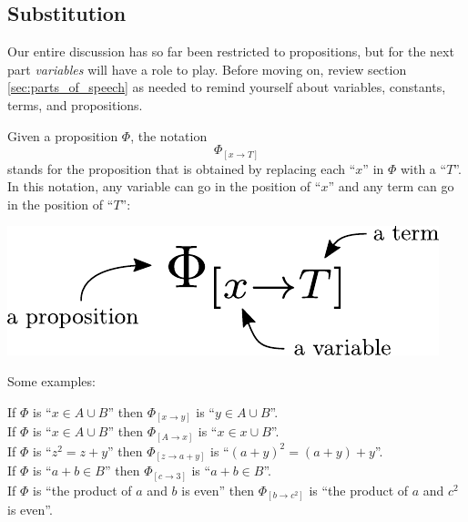 \documentclass[12pt]{article}
\newcommand{\SUBST}[3]{{#1}_{[{#2}\rightarrow{#3}]}}
\newcounter{exercise}
\newcounter{rule}
\newcommand{\indented}[1]{\begin{adjustwidth}{1em}{}#1\end{adjustwidth}}
\def\pA{\Phi}
\begin{document}








\subsection{Substitution}
\label{sec:subst}

Our entire discussion has so far been restricted to propositions, but for the next part \emph{variables} will have a role to play.
Before moving on, review section
\ref{sec:parts_of_speech} as needed to remind yourself about variables, constants, terms, and propositions.

\newcommand{\eg}[4]{If $\pA$ is ``#1'' then $\SUBST{\pA}{#2}{#3}$ is ``#4''.}
\def\lsp{\\[0.4em]}

Given a proposition $\pA$, the notation
$$
\SUBST{\pA}{x}{T}
$$
stands for the proposition that is obtained by replacing each ``$x$'' in $\pA$ with a ``$T$''.
In this notation, any variable can go in the position of ``$x$'' and any term can go in the position of ``$T$'':
\begin{center}\includegraphics[scale=0.8]{subst.pdf}\end{center}
Some examples:
\indented{
\eg{$x\in A\cup B$}{x}{y}{$y\in A\cup B$}\lsp
\eg{$x\in A\cup B$}{A}{x}{$x\in x\cup B$}\lsp
\eg{$z^2=z+y$}{z}{a+y}{$(a+y)^2=(a+y)+y$}\lsp
\eg{$a+b\in B$}{c}{3}{$a+b\in B$}\lsp
\eg{the product of $a$ and $b$ is even}{b}{c^2}{the product of $a$ and $c^2$ is even}
}
\end{document}
